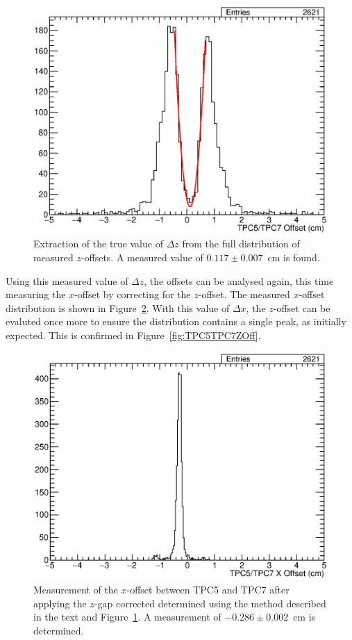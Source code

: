 \begin{figure}
  \centering
  \includegraphics[width=12cm]{TPC5TPC7GapFit.eps}
  \caption{Extraction of the true value of $\Delta z$ from the full distribution of measured $z$-offsets.  A measured value of $0.117\pm0.007$~cm is found.}
  \label{fig:TPC5TPC7GapFit}
\end{figure}

Using this measured value of $\Delta z$, the offsets can be analysed again, this time measuring the $x$-offset by correcting for the $z$-offset.  The measured $x$-offset distribution is shown in Figure~\ref{fig:TPC5TPC7XOff}.  With this value of $\Delta x$, the $z$-offset can be evaluted once more to ensure the distribution contains a single peak, as initially expected.  This is confirmed in Figure~\ref{fig:TPC5TPC7ZOff}.

\begin{figure}
  \centering
  \includegraphics[width=12cm]{TPC5TPC7XOff.eps}
  \caption{Measurement of the $x$-offset between TPC5 and TPC7 after applying the $z$-gap corrected determined using the method described in the text and Figure~\ref{fig:TPC5TPC7GapFit}.  A measurement of $-0.286\pm0.002$~cm is determined.}
  \label{fig:TPC5TPC7XOff}
\end{figure}

